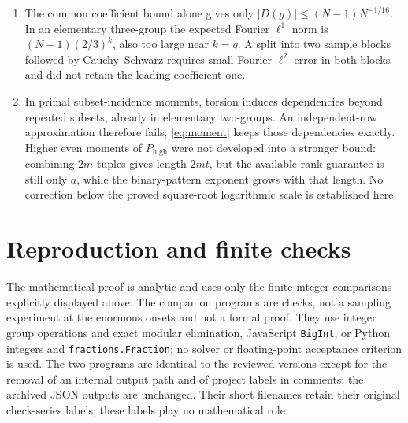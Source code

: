 \documentclass[11pt]{amsart}
\theoremstyle{remark}
\newcommand{\Z}{\mathbb Z}
\newcommand{\hi}{P_{\mathrm{high}}}
\begin{document}
\begin{enumerate}
lattice count. Rational rank alone is also inadequate: $\Z/2\Z$
has rational rank zero but has $N$ homomorphisms into $(\Z/2)^n$.
\item The common coefficient bound alone gives only
$|D(g)|\le(N-1)N^{-1/16}$. In an elementary three-group the expected
Fourier $\ell^1$ norm is $(N-1)(2/3)^k$, also too large near $k=q$.
A split into two sample blocks followed by Cauchy--Schwarz requires
small Fourier $\ell^2$ error in both blocks and did not retain the
leading coefficient one.
\item In primal subset-incidence moments, torsion induces
dependencies beyond repeated subsets, already in elementary
two-groups. An independent-row approximation therefore fails;
\eqref{eq:moment} keeps those dependencies exactly. Higher even
moments of $\hi$ were not developed into a stronger bound: combining
$2m$ tuples gives length $2mt$, but the available rank guarantee is
still only $a$, while the binary-pattern exponent grows with that
length. No correction below the proved square-root logarithmic
scale is established here.
\end{enumerate}

\section{Reproduction and finite checks}\label{sec:reproduce}
The mathematical proof is analytic and uses only the finite integer
comparisons explicitly displayed above. The companion programs are
checks, not a sampling experiment at the enormous onsets and not a
formal proof. They use integer group operations and exact modular
elimination, JavaScript \texttt{BigInt}, or Python integers and
\texttt{fractions.Fraction}; no solver or floating-point acceptance
criterion is used. The two programs are
identical to the reviewed versions except for the removal of an internal output path and of project labels in comments; the archived JSON outputs are unchanged. Their short filenames retain their original check-series
labels; these labels play no mathematical role.
\end{document}
